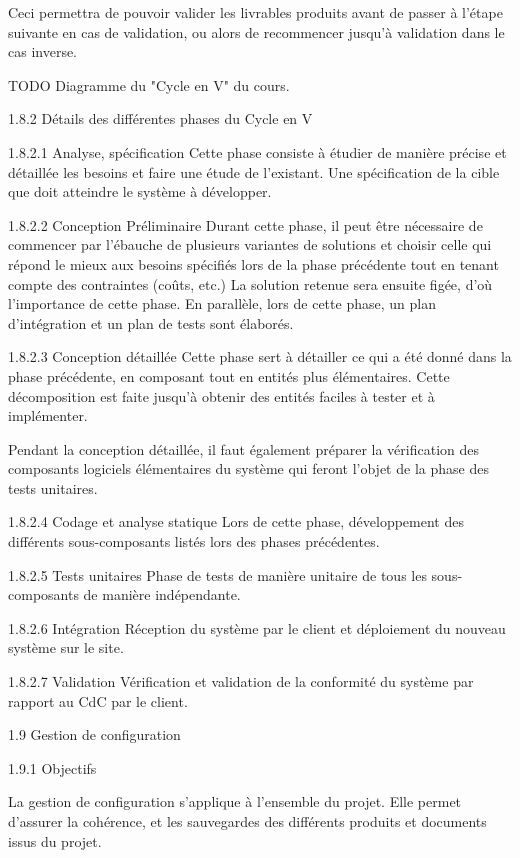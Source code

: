 Ceci permettra de pouvoir valider les livrables produits avant de passer à l'étape suivante en cas de validation, ou alors de recommencer jusqu'à validation dans le cas inverse.

TODO Diagramme du "Cycle en V" du cours.

1.8.2   Détails des différentes phases du Cycle en V

1.8.2.1   Analyse, spécification
Cette phase consiste à étudier de manière précise et détaillée les besoins et faire une étude de l'existant. Une spécification de la cible que doit atteindre le système à développer.

1.8.2.2   Conception Préliminaire
Durant cette phase, il peut être nécessaire de commencer par l'ébauche de plusieurs variantes de solutions et choisir celle qui répond le mieux aux besoins spécifiés lors de la phase précédente tout en tenant compte des contraintes (coûts, etc.) La solution retenue sera ensuite figée, d'où l'importance de cette phase. En parallèle, lors de cette phase, un plan d'intégration et un plan de tests sont élaborés.

1.8.2.3   Conception détaillée
Cette phase sert à détailler ce qui a été donné dans la phase précédente, en composant tout en entités plus élémentaires. Cette décomposition est faite jusqu'à obtenir des entités faciles à tester et à implémenter.

Pendant la conception détaillée, il faut également préparer la vérification des composants logiciels élémentaires du système qui feront l'objet de la phase des tests unitaires.

1.8.2.4   Codage et analyse statique
Lors de cette phase, développement des différents sous-composants listés lors des phases précédentes.

1.8.2.5   Tests unitaires
Phase de tests de manière unitaire de tous les sous-composants de manière indépendante.

1.8.2.6   Intégration
Réception du système par le client et déploiement du nouveau système sur le site.

1.8.2.7   Validation
Vérification et validation de la conformité du système par rapport au CdC par le client.

1.9   Gestion de configuration

1.9.1   Objectifs

La gestion de configuration s'applique à l'ensemble du projet. Elle permet d'assurer la cohérence, et les sauvegardes des différents produits et documents issus du projet.

